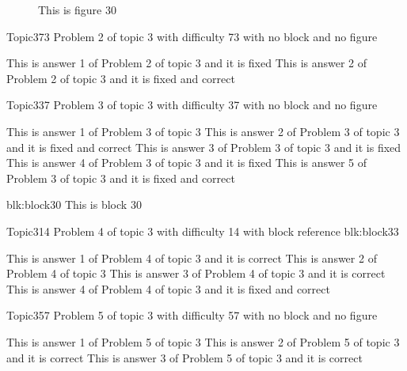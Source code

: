 \documentclass[master]{exam}
\begin{document}
\begin{figure}
	\begin{center}
		This is figure 30 
		\label{fig:figure30}
	\end{center}
\end{figure}

\begin{problem}{Topic3}{73}
	Problem 2 of topic 3 with difficulty 73 with no block and no figure
	\begin{answers}
		\answer[fixed] This is answer 1 of Problem 2 of topic 3 and it is fixed
		 This is answer 2 of Problem 2 of topic 3 and it is fixed and correct
	\end{answers}
\end{problem}

\begin{problem}{Topic3}{37}
	Problem 3 of topic 3 with difficulty 37 with no block and no figure
	\begin{answers}
		\answer This is answer 1 of Problem 3 of topic 3 
		 This is answer 2 of Problem 3 of topic 3 and it is fixed and correct
		\answer[fixed] This is answer 3 of Problem 3 of topic 3 and it is fixed
		\answer[fixed] This is answer 4 of Problem 3 of topic 3 and it is fixed
		 This is answer 5 of Problem 3 of topic 3 and it is fixed and correct
	\end{answers}
\end{problem}



\begin{block}{blk:block30}
This is block 30
\end{block}


\begin{problem}[requires=blk:block33]{Topic3}{14}
	Problem 4 of topic 3 with difficulty 14 with block reference blk:block33
	\begin{answers}
		\answer[correct] This is answer 1 of Problem 4 of topic 3 and it is correct
		\answer This is answer 2 of Problem 4 of topic 3 
		\answer[correct] This is answer 3 of Problem 4 of topic 3 and it is correct
		 This is answer 4 of Problem 4 of topic 3 and it is fixed and correct
	\end{answers}
\end{problem}

\begin{problem}{Topic3}{57}
	Problem 5 of topic 3 with difficulty 57 with no block and no figure
	\begin{answers}
		\answer This is answer 1 of Problem 5 of topic 3 
		\answer[correct] This is answer 2 of Problem 5 of topic 3 and it is correct
		\answer[correct] This is answer 3 of Problem 5 of topic 3 and it is correct
	\end{answers}
\end{problem}
\end{document}
